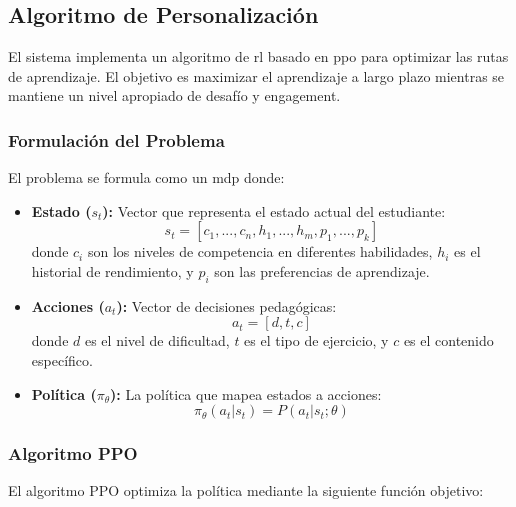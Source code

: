 \subsection{Algoritmo de Personalización}
\label{algoritmo-personalizacion}

El sistema implementa un algoritmo de \gls{rl} basado en \gls{ppo} \cite{schulman2017proximal} para optimizar las rutas de aprendizaje. El objetivo es maximizar el aprendizaje a largo plazo mientras se mantiene un nivel apropiado de desafío y engagement.

\subsubsection{Formulación del Problema}

El problema se formula como un \gls{mdp} donde:

\begin{itemize}
	\item \textbf{Estado ($s_t$):} Vector que representa el estado actual del estudiante:
	      \begin{equation}
		      s_t = [c_1, ..., c_n, h_1, ..., h_m, p_1, ..., p_k]
	      \end{equation}
	      donde $c_i$ son los niveles de competencia en diferentes habilidades, $h_i$ es el historial de rendimiento, y $p_i$ son las preferencias de aprendizaje.

	\item \textbf{Acciones ($a_t$):} Vector de decisiones pedagógicas:
	      \begin{equation}
		      a_t = [d, t, c]
	      \end{equation}
	      donde $d$ es el nivel de dificultad, $t$ es el tipo de ejercicio, y $c$ es el contenido específico.

	\item \textbf{Política ($\pi_\theta$):} La política que mapea estados a acciones:
	      \begin{equation}
		      \pi_\theta(a_t|s_t) = P(a_t|s_t; \theta)
	      \end{equation}
\end{itemize}

\subsubsection{Algoritmo PPO}

El algoritmo PPO optimiza la política mediante la siguiente función objetivo:

